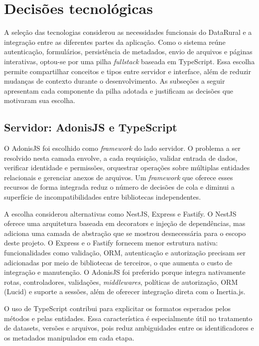\section{Decisões tecnológicas}

A seleção das tecnologias considerou as necessidades funcionais do DataRural e a integração entre as diferentes partes da aplicação. Como o sistema reúne autenticação, formulários, persistência de metadados, envio de arquivos e páginas interativas, optou-se por uma pilha \textit{fullstack} baseada em TypeScript. Essa escolha permite compartilhar conceitos e tipos entre servidor e interface, além de reduzir mudanças de contexto durante o desenvolvimento. As subseções a seguir apresentam cada componente da pilha adotada e justificam as decisões que motivaram sua escolha.

\subsection{Servidor: AdonisJS e TypeScript}

O AdonisJS foi escolhido como \textit{framework} do lado servidor. O problema a ser resolvido nesta camada envolve, a cada requisição, validar entrada de dados, verificar identidade e permissões, orquestrar operações sobre múltiplas entidades relacionais e gerenciar anexos de arquivos. Um \textit{framework} que oferece esses recursos de forma integrada reduz o número de decisões de cola e diminui a superfície de incompatibilidades entre bibliotecas independentes.

A escolha considerou alternativas como NestJS, Express e Fastify. O NestJS oferece uma arquitetura baseada em decorators e injeção de dependências, mas adiciona uma camada de abstração que se mostrou desnecessária para o escopo deste projeto. O Express e o Fastify fornecem menor estrutura nativa: funcionalidades como validação, ORM, autenticação e autorização precisam ser adicionadas por meio de bibliotecas de terceiros, o que aumenta o custo de integração e manutenção. O AdonisJS foi preferido porque integra nativamente rotas, controladores, validações, \textit{middlewares}, políticas de autorização, ORM (Lucid) e suporte a sessões, além de oferecer integração direta com o Inertia.js.

O uso de TypeScript contribui para explicitar os formatos esperados pelos métodos e pelas entidades. Essa característica é especialmente útil no tratamento de datasets, versões e arquivos, pois reduz ambiguidades entre os identificadores e os metadados manipulados em cada etapa.

